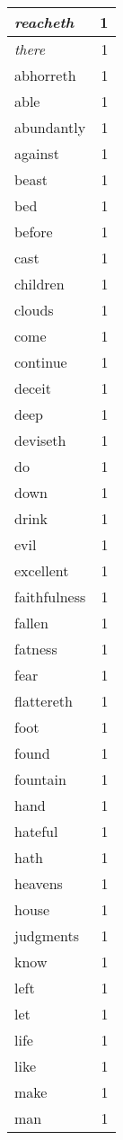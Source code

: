 \begin{center}
\begin{longtable}{l|r}
\emph{reacheth} & 1 \\ \hline
\emph{there} & 1 \\ \hline
abhorreth & 1 \\ \hline
able & 1 \\ \hline
abundantly & 1 \\ \hline
against & 1 \\ \hline
beast & 1 \\ \hline
bed & 1 \\ \hline
before & 1 \\ \hline
cast & 1 \\ \hline
children & 1 \\ \hline
clouds & 1 \\ \hline
come & 1 \\ \hline
continue & 1 \\ \hline
deceit & 1 \\ \hline
deep & 1 \\ \hline
deviseth & 1 \\ \hline
do & 1 \\ \hline
down & 1 \\ \hline
drink & 1 \\ \hline
evil & 1 \\ \hline
excellent & 1 \\ \hline
faithfulness & 1 \\ \hline
fallen & 1 \\ \hline
fatness & 1 \\ \hline
fear & 1 \\ \hline
flattereth & 1 \\ \hline
foot & 1 \\ \hline
found & 1 \\ \hline
fountain & 1 \\ \hline
hand & 1 \\ \hline
hateful & 1 \\ \hline
hath & 1 \\ \hline
heavens & 1 \\ \hline
house & 1 \\ \hline
judgments & 1 \\ \hline
know & 1 \\ \hline
left & 1 \\ \hline
let & 1 \\ \hline
life & 1 \\ \hline
like & 1 \\ \hline
make & 1 \\ \hline
man & 1 \\ \hline

\end{longtable}
\end{center}
